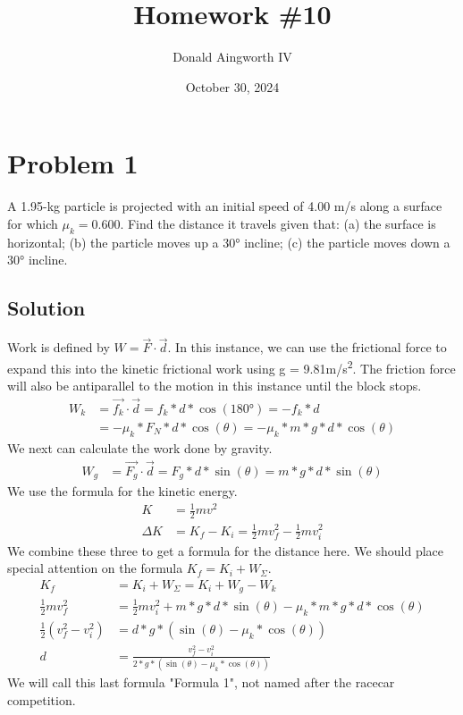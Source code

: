 \documentclass[12pt]{article}
\title{Homework \#10}
\author{Donald Aingworth IV}
\date{October 30, 2024}
\begin{document}

\maketitle

\pagebreak
\section*{Problem 1}
A 1.95-kg particle is projected with an initial speed of 4.00 m/s along a surface for which $\mu_k = 0.600$. Find the distance it travels given that: (a) the surface is horizontal; (b) the particle moves up a 30\unit{\degree} incline; (c) the particle moves down a 30\unit{\degree} incline.

\subsection*{Solution}
Work is defined by $ W = \vec{F}\cdot\vec{d} $. In this instance, we can use the frictional force to expand this into the kinetic frictional work using g = 9.81\unit{\meter/\second^2}. The friction force will also be antiparallel to the motion in this instance until the block stops.
\begin{align*}
    W_k &=  \vec{f_k}\cdot\vec{d}
        =   f_k*d*\cos(180\unit{\degree})
        =   -f_k*d\\
        &=  -\mu_k*F_N*d*\cos(\theta)
        =   -\mu_k*m*g*d*\cos(\theta)
\end{align*}
We next can calculate the work done by gravity.
\begin{align*}
    W_g &=  \vec{F_g}\cdot\vec{d}
        =   F_g*d*\sin(\theta)
        =   m*g*d*\sin(\theta)
\end{align*}
We use the formula for the kinetic energy.
\begin{align*}
    K   &=  \frac{1}{2}mv^2\\
    \Delta K    &=  K_f - K_i
                =   \frac{1}{2}mv_f^2 - \frac{1}{2}mv_i^2
\end{align*}
We combine these three to get a formula for the distance here. We should place special attention on the formula $K_f = K_i + W_\Sigma$. 
\begin{align*}
    K_f &=  K_i + W_\Sigma
        =   K_i + W_g - W_k\\
    \frac{1}{2}mv_f^2 &= \frac{1}{2}mv_i^2 + m*g*d*\sin(\theta) - \mu_k*m*g*d*\cos(\theta)\\
    \frac{1}{2}(v_f^2 - v_i^2)  &=  d*g*(\sin(\theta)-\mu_k*\cos(\theta))\\
    d   &=  \frac{v_f^2 - v_i^2}{2*g*(\sin(\theta)-\mu_k*\cos(\theta))}
\end{align*}
We will call this last formula  "Formula 1", not named after the racecar competition.
\pagebreak
\end{document}
